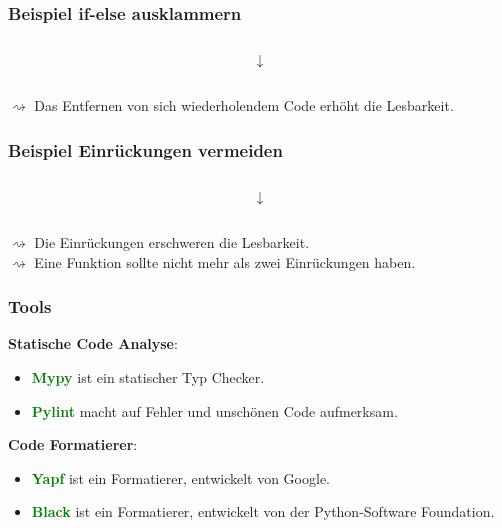 \documentclass[10pt]{beamer}
\newcommand{\htgreen}[1] {{\bf \textcolor{Green}{#1}}}
\begin{document}
\begin{frame}
  \frametitle{Beispiel if-else ausklammern}
  \begin{figure}[thp]
  \centering 
  \begin{minipage}{0.4\textwidth}
  \inputminted{python}{duplication_bad.py}
  \end{minipage}
  \end{figure}
  \[\downarrow\]
  \begin{figure}[thp]
  \centering 
  \begin{minipage}{0.4\textwidth}
  \inputminted{python}{duplication_good.py}
  \end{minipage}
  \end{figure}
  \vspace*{0.5cm}
  $\rightsquigarrow$ Das Entfernen von sich wiederholendem Code erhöht die Lesbarkeit.\\
\end{frame}

\begin{frame}
  \frametitle{Beispiel Einrückungen vermeiden}
  \begin{figure}[thp]
  \centering 
  \begin{minipage}{0.4\textwidth}
  \inputminted{python}{indent_bad.py}
  \end{minipage}
  \end{figure}
  \[\downarrow\]
  \begin{figure}[thp]
  \centering 
  \begin{minipage}{0.4\textwidth}
  \inputminted{python}{indent_good.py}
  \end{minipage}
  \end{figure}
  \vspace*{0.5cm}
  $\rightsquigarrow$ Die Einrückungen erschweren die Lesbarkeit.\\
  $\rightsquigarrow$ Eine Funktion sollte nicht mehr als zwei Einrückungen haben.

\end{frame}

\begin{frame}
  \frametitle{Tools}
  {\bf Statische Code Analyse}:
  \begin{itemize}
    \item \htgreen{Mypy} ist ein statischer Typ Checker. 
    \item \htgreen{Pylint} macht auf Fehler und unschönen Code aufmerksam.
  \end{itemize}

  \vspace{0.5cm}

  {\bf Code Formatierer}:
  \begin{itemize}
    \item \htgreen{Yapf} ist ein Formatierer, entwickelt von Google.
    \item \htgreen{Black} ist ein Formatierer, entwickelt von der
        Python-Software Foundation.
  \end{itemize}
\end{frame}
\end{document}

